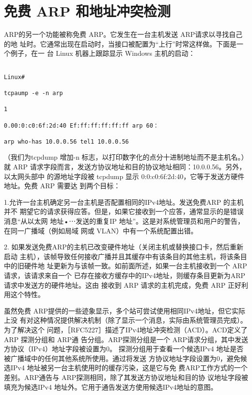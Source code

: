 \section{免费 ARP 和地址冲突检测}

ARP的另一个功能被称免费 ARP。它发生在一台主机发送 ARP请求以寻找自己的地
址时。它通常出现在启动时，当接口被配置为“上行”时常这样做。下面是一个例子，在一
台 Linux 机器上跟踪显示 Windows 主机的启动：

\begin{verbatim}
    
Linux#

tcpaump -e -n arp

1

0.00:0:c0:6f:2d:40 Ef:ff:ff:ff:ff:ff arp 60：

arp who-has 10.0.0.56 tel1 10.0.0.56
\end{verbatim}

（我们为tcpdump 增加-n 标志，以打印数字化的点分十进制地址而不是主机名。）就
ARP 请求字段而言，发送方协议地址和目的协议地址相同：10.0.0.56。另外，以太网头部中
的源地址字段被 tcpdump 显示 0:0:c0:6f:2d:40，它等于发送方硬件地址。免费 ARP 需要达
到两个目标：

1.允许一台主机确定另一台主机是否配置相同的IPv4地址。发送免费ARP 的主机并不
期望它的请求获得应答。但是，如果它接收到一个应答，通常显示的是错误消息“从以太网
地址•⋯发送的重复IP 地址”。这是对系统管理员和用户的警告，在同一广播域（例如局域
网或 VLAN）中有一个系统配置出错。

2. 如果发送免费ARP的主机已改变硬件地址（关闭主机或替换接口卡，然后重新启动
主机），该帧导致任何接收广播并且其缓存中有该条目的其他主机，将该条目中的旧硬件地
址更新为与该帧一致。如前面所述，如果一台主机接收到一个 ARP 请求，该请求来自一个
已存在接收方缓存中的IPv4地址，则缓存条目更新为ARP 请求中发送方的硬件地址。这由
接收到 ARP 请求的主机完成，免费 ARP 正好利用这个特性。

虽然免费 ARP提供的一些迹象显示，多个站可尝试使用相同IPv4地址，但它实际上没
有对这种情况提供解决机制（除了显示一个消息，实际由系统管理员完成）。为了解决这个
问题，［RFC5227］描述了IPv4地址冲突检测（ACD）。ACD定义了 ARP 探测分组和 ARP通
告分组。ARP探测分组是一个 ARP请求分组，其中发送方协议（IPv4）地址字段被设置为0。
探测分组用于查看一个候选IPv4 地址是否被广播域中的任何其他系统所使用。通过将发送
方协议地址字段设置为0，避免候选IPv4 地址被另一台主机使用时的缓存污染，这是它与免
费ARP工作方式的一个差别。ARP通告与 ARP探测相同，除了其发送方协议地址和目的协
议地址字段被填充为候选IPv4 地址外。它用于通告发送方使用候选IPv4地址的意图。

